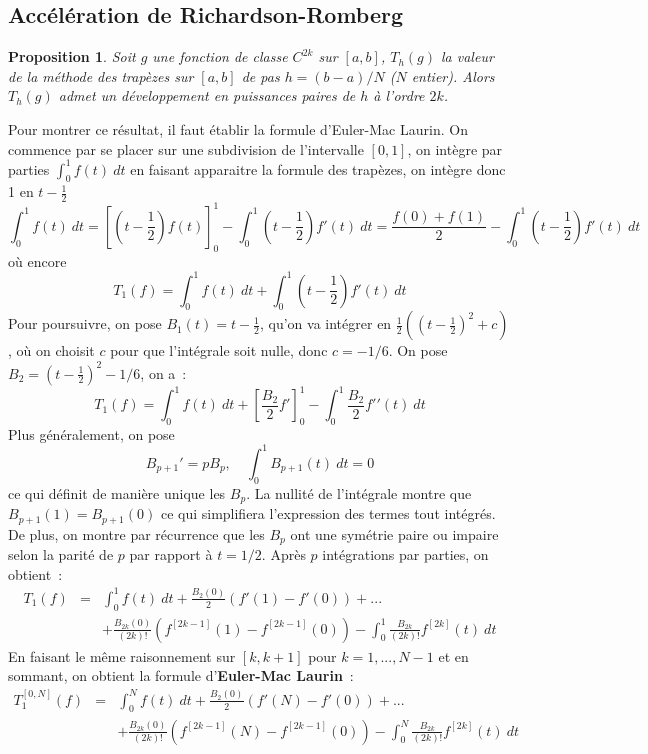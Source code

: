 \documentclass[a4paper,11pt]{article}
\newtheorem{prop}[thm]{Proposition}
\begin{document}
\begin{giacjshere}
\subsection{Accélération de Richardson-Romberg}
\begin{prop}
Soit $g$ une fonction de classe $C^{2k}$ sur $[a,b]$, 
$T_h(g)$ la valeur de la méthode des trapèzes sur $[a,b]$ de pas 
$h=(b-a)/N$ ($N$ entier).
Alors $T_h(g)$ admet un développement en puissances paires de $h$
à l'ordre $2k$.
\end{prop}

Pour montrer ce résultat, il faut établir la formule d'Euler-Mac
Laurin. On commence par se placer sur une subdivision de l'intervalle
$[0,1]$, on intègre par parties $\int_0^1 f(t)\ dt$ en faisant apparaitre
la formule des trapèzes, on intègre donc 1 en $t-\frac12$
$$ \int_0^1 f(t) \ dt = 
[(t-\frac12)f(t)]_0^1 - \int_0^1 (t-\frac12)f'(t) \ dt =
\frac{f(0)+f(1)}{2} - \int_0^1 (t-\frac12)f'(t) \ dt
$$
où encore
$$ T_1(f)=\int_0^1 f(t) \ dt 
+  \int_0^1 (t-\frac12)f'(t) \ dt $$
Pour poursuivre, on pose $B_1(t)=t-\frac12$, qu'on va intégrer
en $\frac12((t-\frac12)^2+c)$, où on choisit $c$ pour que l'intégrale
soit nulle, donc $c=-1/6$. On pose $B_2=(t-\frac12)^2-1/6$, on a~:
$$  T_1(f)=\int_0^1 f(t) \ dt 
+ [\frac{B_2}{2} f']_0^1 - \int_0^1 \frac{B_2}{2}f'{'}(t) \ dt 
$$
Plus
généralement, on pose
$$ B_{p+1}'=pB_p, \quad \int_0^1 B_{p+1}(t) \ dt=0 $$
ce qui définit de manière unique les $B_p$. La nullité de l'intégrale
montre que $B_{p+1}(1)=B_{p+1}(0)$ ce qui simplifiera l'expression des
termes tout intégrés. De plus, on montre par récurrence
que les $B_p$ ont une symétrie paire
ou impaire selon la parité de $p$ par rapport à $t=1/2$.
Après $p$ intégrations par parties, on obtient~:
\begin{eqnarray*}
  T_1(f)&=&\int_0^1 f(t) \ dt 
+ \frac{B_2(0)}{2} (f'(1)-f'(0)) 
+ ... \\
& &+ \frac{B_{2k}(0)}{(2k)!} (f^{[2k-1]}(1)-f^{[2k-1]}(0)) 
- \int_0^1 \frac{B_{2k}}{(2k)!} f^{[2k]}(t) \ dt 
\end{eqnarray*}
En faisant le même raisonnement sur $[k,k+1]$ pour $k=1,...,N-1$
et en sommant, on obtient la formule 
d'{\bf Euler-Mac Laurin}~:
\begin{eqnarray*}
  T_1^{[0,N]}(f)&=&\int_0^N f(t) \ dt 
+ \frac{B_2(0)}{2} (f'(N)-f'(0)) 
+ ... \\
& & + \frac{B_{2k}(0)}{(2k)!} (f^{[2k-1]}(N)-f^{[2k-1]}(0)) 
- \int_0^N \frac{B_{2k}}{(2k)!} f^{[2k]}(t) \ dt 

\end{eqnarray*}
\end{giacjshere}
\end{document}
